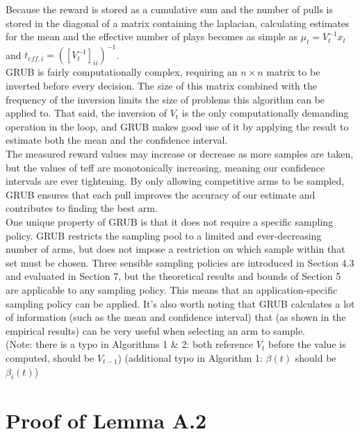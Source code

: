 \documentclass{article}[12pt]
\begin{document}
Because the reward is stored as a cumulative sum and the number of pulls is stored in the diagonal of a matrix containing the laplacian,
calculating estimates for the mean and the effective number of plays becomes as simple as $\mu_t = V_t^{-1} x_t$ and $t_{eff,i} = \left( \left[ V_t^{-1} \right]_{ii} \right)^{-1}$. \\

GRUB is fairly computationally complex, requiring an $n \times n$ matrix to be inverted before every decision.
The size of this matrix combined with the frequency of the inversion limits the size of problems this algorithm can be applied to.
That said, the inversion of $V_t$ is the only computationally demanding operation in the loop,
and GRUB makes good use of it by applying the result to estimate both the mean and the confidence interval. \\

The measured reward values may increase or decrease as more samples are taken, but the values of teff are monotonically increasing, meaning our confidence intervals are ever tightening.
By only allowing competitive arms to be sampled, GRUB ensures that each pull improves the accuracy of our estimate and contributes to finding the best arm. \\

One unique property of GRUB is that it does not require a specific sampling policy.
GRUB restricts the sampling pool to a limited and ever-decreasing number of arms, but does not impose a restriction on which sample within that set must be chosen.
Three sensible sampling policies are introduced in Section 4.3 and evaluated in Section 7, but the theoretical results and bounds of Section 5 are applicable to any sampling policy.
This means that an application-specific sampling policy can be applied.
It’s also worth noting that GRUB calculates a lot of information (such as the mean and confidence interval) that (as shown in the empirical results) can be very useful when selecting an arm to sample. \\

(Note: there is a typo in Algorithms 1 \& 2: both reference $V_t$ before the value is computed, should be $V_{t-1}$)
(additional typo in Algorithm 1:  $\beta(t)$ should be $\beta_i(t)$)

\section{Proof of Lemma A.2}
\end{document}
